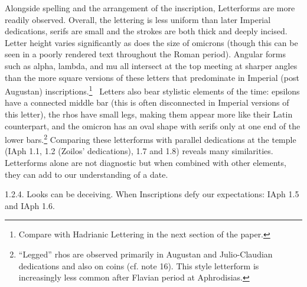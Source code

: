 \documentclass[amsthm,ebook]{saparticle}
\begin{document}
Alongside spelling and the arrangement of the inscription, Letterforms are more readily observed. Overall, the lettering
is less uniform than later Imperial dedications, serifs are small and the strokes are both thick and deeply incised.
Letter height varies significantly as does the size of omicrons (though this can be seen in a poorly rendered text
throughout the Roman period). Angular forms such as alpha, lambda, and mu all intersect at the top meeting at sharper
angles than the more square versions of these letters that predominate in Imperial (post Augustan)
inscriptions.\footnote{ Compare with Hadrianic Lettering in the next section of the paper.} \ Letters also bear
stylistic elements of the time: epsilons have a connected middle bar (this is often disconnected in Imperial versions
of this letter), the rhos have small legs, making them appear more like their Latin counterpart, and the omicron has an
oval shape with serifs only at one end of the lower bars.\footnote{ “Legged” rhos are observed primarily in Augustan
and Julio-Claudian dedications and also on coins (cf. note 16). This style letterform is increasingly less common after
Flavian period at Aphrodisias. } Comparing these letterforms with parallel dedications at the temple (IAph 1.1, 1.2
(Zoilos’ dedications), 1.7 and 1.8) reveals many similarities. Letterforms alone are not diagnostic but when combined
with other elements, they can add to our understanding of a date. 


\bigskip


\bigskip

1.2.4. Looks can be deceiving. When Inscriptions defy our expectations: IAph 1.5 and IAph 1.6.


\bigskip
\end{document}
